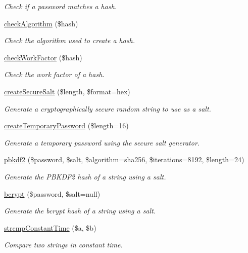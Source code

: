 \begin{DoxyCompactItemize}
\begin{DoxyCompactList}\small\item\em Check if a password matches a hash. \end{DoxyCompactList}\item 
\hyperlink{classPassword_a9bcd6f8ec84385ed4973e4bef05ecbea}{check\+Algorithm} (\$hash)
\begin{DoxyCompactList}\small\item\em Check the algorithm used to create a hash. \end{DoxyCompactList}\item 
\hyperlink{classPassword_aba9bca7cad134de9f4895852523ebec1}{check\+Work\+Factor} (\$hash)
\begin{DoxyCompactList}\small\item\em Check the work factor of a hash. \end{DoxyCompactList}\item 
\hyperlink{classPassword_a0b40c5a34329822c54705941c04579bc}{create\+Secure\+Salt} (\$length, \$format=\textquotesingle{}hex\textquotesingle{})
\begin{DoxyCompactList}\small\item\em Generate a cryptographically secure random string to use as a salt. \end{DoxyCompactList}\item 
\hyperlink{classPassword_aef378e672d57dbe203242230c3cc45a9}{create\+Temporary\+Password} (\$length=16)
\begin{DoxyCompactList}\small\item\em Generate a temporary password using the secure salt generator. \end{DoxyCompactList}\item 
\hyperlink{classPassword_a8f65e4dcd66bdf6507db9e09c05d9932}{pbkdf2} (\$password, \$salt, \$algorithm=\textquotesingle{}sha256\textquotesingle{}, \$iterations=8192, \$length=24)
\begin{DoxyCompactList}\small\item\em Generate the P\+B\+K\+D\+F2 hash of a string using a salt. \end{DoxyCompactList}\item 
\hyperlink{classPassword_a097e73abceaf4b976c92471f9b4a2cab}{bcrypt} (\$password, \$salt=null)
\begin{DoxyCompactList}\small\item\em Generate the bcrypt hash of a string using a salt. \end{DoxyCompactList}\item 
\hyperlink{classPassword_a56edcc9dc50a2dc82886e943de17786b}{strcmp\+Constant\+Time} (\$a, \$b)
\begin{DoxyCompactList}\small\item\em Compare two strings in constant time. \end{DoxyCompactList}\end{DoxyCompactItemize}
